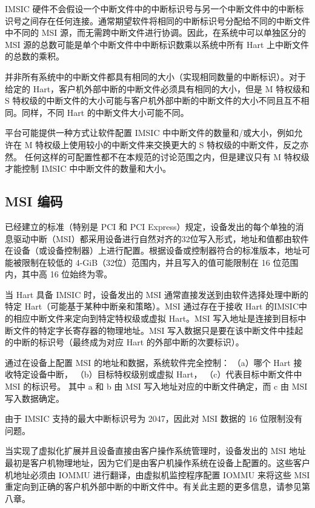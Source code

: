\begin{translation}
IMSIC 硬件不会假设一个中断文件中的中断标识号与另一个中断文件中的中断标识号之间存在任何连接。通常期望软件将相同的中断标识号分配给不同的中断文件中不同的 MSI 源，而无需跨中断文件进行协调。因此，在系统中可以单独区分的 MSI 源的总数可能是单个中断文件中中断标识数乘以系统中所有 Hart 上中断文件的总数的乘积。

并非所有系统中的中断文件都具有相同的大小（实现相同数量的中断标识）。对于给定的 Hart，客户机外部中断的中断文件必须具有相同的大小，但是 M 特权级和 S 特权级的中断文件的大小可能与客户机外部中断的中断文件的大小不同且互不相同。同样，不同 Hart 的中断文件大小可能不同。

平台可能提供一种方式让软件配置 IMSIC 中中断文件的数量和/或大小，例如允许在 M 特权级上使用较小的中断文件来交换更大的 S 特权级的中断文件，反之亦然。
任何这样的可配置性都不在本规范的讨论范围之内，但是建议只有 M 特权级才能控制 IMSIC 中中断文件的数量和大小。

\subsection{MSI 编码}

已经建立的标准（特别是 PCI 和 PCI Express）规定，设备发出的每个单独的消息驱动中断（MSI）都采用设备进行自然对齐的32位写入形式，地址和值都由软件在设备（或设备控制器）上进行配置。根据设备或控制器符合的标准版本，地址可能被限制在较低的 4-GiB（32位）范围内，并且写入的值可能限制在 16 位范围内，其中高 16 位始终为零。

当 {\RISCV} Hart 具备 IMSIC 时，设备发出的 MSI 通常直接发送到由软件选择处理中断的特定 Hart（可能基于某种中断亲和策略）。MSI 通过存在于接收 Hart 的IMSIC中的相应中断文件来定向到特定特权级或虚拟 Hart。MSI 写入地址是连接到目标中断文件的特定字长寄存器的物理地址。MSI 写入数据只是要在该中断文件中挂起的中断的标识号（最终成为对应 Hart 的外部中断的次要标识）。

通过在设备上配置 MSI 的地址和数据，系统软件完全控制：
（a）哪个 Hart 接收特定设备中断，
（b）目标特权级别或虚拟 Hart，
（c）代表目标中断文件中 MSI 的标识号。
其中 a 和 b 由 MSI 写入地址对应的中断文件确定，而 c 由 MSI 写入数据确定。

\begin{commentary}
由于 IMSIC 支持的最大中断标识号为 2047，因此对 MSI 数据的 16 位限制没有问题。
\end{commentary}

当实现了虚拟化扩展并且设备直接由客户操作系统管理时，设备发出的 MSI 地址最初是客户机物理地址，因为它们是由客户机操作系统在设备上配置的。这些客户机地址必须由 IOMMU 进行翻译，由虚拟机监控程序配置 IOMMU 来将这些 MSI 重定向到正确的客户机外部中断的中断文件中。有关此主题的更多信息，请参见第八章。


\end{translation}
